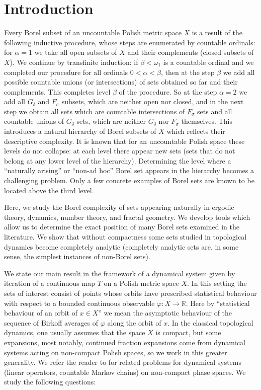 \documentclass{amsart}
\theoremstyle{definition}
\renewcommand{\phi}{\varphi}
\newcommand{\R}{\mathbb{R}}
\begin{document}
\section{Introduction}
Every Borel subset of an uncountable Polish metric space $X$ is a result of the following inductive procedure, whose steps are enumerated by countable ordinals:
for $\alpha=1$ we take all  open subsets of $X$ and their complements (closed subsets of $X$). We continue by transfinite induction:
if $\beta<\omega_1$ is a countable ordinal and we completed our procedure for all ordinals $0<\alpha<\beta$, then at the step $\beta$ we add all possible countable unions (or intersections)
of sets obtained so far and their complements. This completes level $\beta$ of the procedure. So at the step $\alpha=2$ we add all $G_{\delta}$ and $F_\sigma$ subsets, which are neither open nor closed, and in the next step we obtain all sets which are countable intersections  of $F_\sigma$ sets and all countable unions of $G_\delta$ sets, which are neither $G_\delta$ nor $F_\sigma$ themselves. This introduces a natural hierarchy of Borel subsets of $X$ which reflects their
descriptive complexity. It is known that for an uncountable Polish space
these levels do not collapse: at each level there appear new sets (sets that do
not belong at any lower level of the hierarchy). Determining the level where a ``naturally arising'' or ``non-ad hoc''
Borel set appears in the hierarchy becomes a challenging problem. Only a few concrete examples of Borel sets are known to be located above the third level.

Here, we study the Borel complexity of sets appearing naturally in ergodic theory, dynamics, number theory, and fractal geometry. We develop tools which allow us to determine the exact position of many Borel sets examined in the literature. We show that without compactness some sets studied in topological dynamics become completely analytic (completely analytic sets are, in some sense, the simplest instances of non-Borel sets).

We state our main result in the framework of a dynamical system given by iteration of a continuous map $T$ on a Polish metric space $X$. In this setting the sets of interest consist of points whose orbits have prescribed statistical behaviour with respect to a bounded continuous observable $\phi\colon X\to\R$. Here by ``statistical behaviour of an orbit of $x\in X$'' we mean the asymptotic behaviour of the sequence of Birkoff averages of $\phi$ along the orbit of $x$. In the classical topological dynamics, one usually assumes that the space $X$ is compact, but some expansions, most notably, continued fraction expansions come from dynamical systems acting on non-compact Polish spaces, so we work in this greater generality.
We refer the reader to \cite{GM, ITV,IV, Sarig} for related problems for dynamical systems (linear operators, countable Markov chains) on non-compact phase spaces. We study the following questions:
\end{document}

